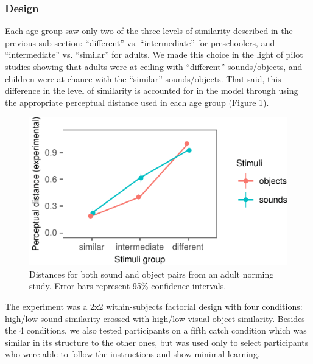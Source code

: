 \documentclass[10pt, letterpaper]{article}
\newenvironment{CodeChunk}{}{}
\begin{document}
\subsubsection{Design}\label{design}

Each age group saw only two of the three levels of similarity described
in the previous sub-section: ``different'' vs. ``intermediate'' for
preschoolers, and ``intermediate'' vs. ``similar'' for adults. We made
this choice in the light of pilot studies showing that adults were at
ceiling with ``different'' sounds/objects, and children were at chance
with the ``similar'' sounds/objects. That said, this difference in the
level of similarity is accounted for in the model through using the
appropriate perceptual distance used in each age group (Figure
\ref{fig:stim}).

\begin{CodeChunk}
\begin{figure}[h]

{\centering \includegraphics{figs/stim-1} 

}

\caption{\label{fig:stim}Distances for both sound and object pairs from an adult norming study. Error bars represent 95\% confidence intervals.}\label{fig:stim}
\end{figure}
\end{CodeChunk}

The experiment was a 2x2 within-subjects factorial design with four
conditions: high/low sound similarity crossed with high/low visual
object similarity. Besides the 4 conditions, we also tested participants
on a fifth catch condition which was similar in its structure to the
other ones, but was used only to select participants who were able to
follow the instructions and show minimal learning.
\end{document}
